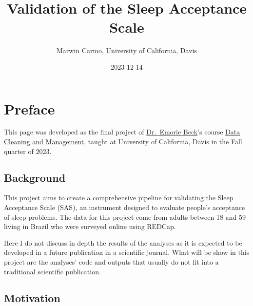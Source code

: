 \documentclass[
  letterpaper,
  DIV=11,
  numbers=noendperiod]{scrreprt}
\title{Validation of the Sleep Acceptance Scale}
\author{Marwin Carmo, University of California, Davis}
\date{2023-12-14}
\renewcommand*\contentsname{Table of contents}
\newcommand\contentsname{Table of contents}
\begin{document}
\maketitle
\ifdefined\Shaded\renewenvironment{Shaded}{\begin{tcolorbox}[boxrule=0pt, sharp corners, frame hidden, interior hidden, enhanced, borderline west={3pt}{0pt}{shadecolor}, breakable]}{\end{tcolorbox}}\fi

\renewcommand*\contentsname{Table of contents}
{
\hypersetup{linkcolor=}
\setcounter{tocdepth}{2}
\tableofcontents
}

\hypertarget{preface}{%
\chapter*{Preface}\label{preface}}


This page was developed as the final project of
\href{https://psychology.ucdavis.edu/people/edbeck}{Dr.~Emorie Beck}'s
course \href{https://emoriebeck.github.io/psc290-data-FQ23/}{Data
Cleaning and Management}, taught at University of California, Davis in
the Fall quarter of 2023.

\hypertarget{background}{%
\section*{Background}\label{background}}


This project aims to create a comprehensive pipeline for validating the
Sleep Acceptance Scale (SAS), an instrument designed to evaluate
people's acceptance of sleep problems. The data for this project come
from adults between 18 and 59 living in Brazil who were surveyed online
using REDCap.

Here I do not discuss in depth the results of the analyses as it is
expected to be developed in a future publication in a scientific
journal. What will be show in this project are the analyses' code and
outputs that usually do not fit into a traditional scientific
publication.

\hypertarget{motivation}{%
\section*{Motivation}\label{motivation}}
\end{document}
